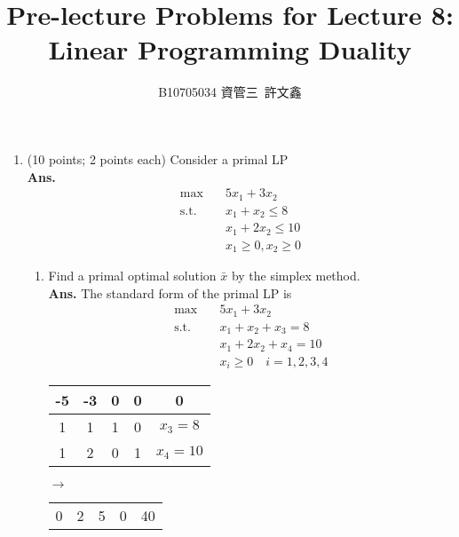 \documentclass[12pt]{article}
\title{Pre-lecture Problems for Lecture 8:\\ Linear Programming Duality}
\author{B10705034 資管三\ 許文鑫}
\begin{document}
\maketitle
\begin{enumerate}
      \item (10 points; 2 points each) Consider a primal LP\\
            \textbf{Ans.}
            \begin{align*}
                  \max \quad        & 5x_1 + 3x_2           \\
                  \text{s.t.} \quad & x_1 + x_2 \leq 8      \\
                                    & x_1 +2x_2 \leq 10     \\
                                    & x_1 \geq 0,x_2 \geq 0
            \end{align*}
            \begin{enumerate}
                  \item Find a primal optimal solution $\bar{x}$ by the simplex method.\\
                        \textbf{Ans.}
                        The standard form of the primal LP is
                        \begin{align*}
                              \max \quad       & 5x_1 + 3x_2                \\
                              \text{s.t.}\quad & x_1 + x_2 + x_3 = 8        \\
                                               & x_1 + 2x_2 + x_4 = 10      \\
                                               & x_i \geq 0 \quad i=1,2,3,4
                        \end{align*}
                        \begin{table}[H]
                              \centering
                              \begin{tabular}{cccc|c}
                                    -5 & -3 & 0 & 0 & 0        \\
                                    \hline
                                    1  & 1  & 1 & 0 & $x_3=8$  \\
                                    1  & 2  & 0 & 1 & $x_4=10$ \\
                              \end{tabular}$\rightarrow$
                              \begin{tabular}{cccc|c}
                                    0 & 2 & 5  & 0 & 40      \\

\end{tabular}
\end{table}
\end{enumerate}
\end{enumerate}
\end{document}
